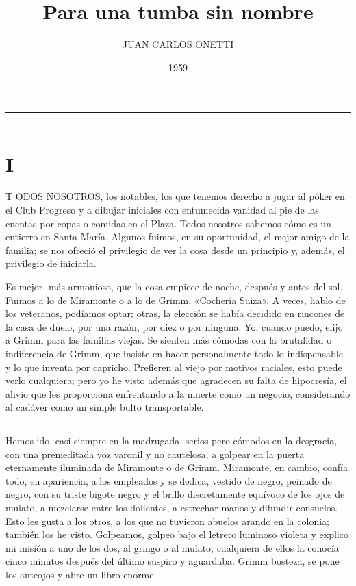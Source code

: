 ﻿\documentclass[oneside,10pt,showtrims]{memoir}
\title{Para una tumba sin nombre}
\author{JUAN CARLOS ONETTI}
\date{1959}
\makeatletter
\def\maketitle{%
\null
\thispagestyle{empty}%
\vskip 1cm
\begin{flushright}
\normalfont\Large \@author
\end{flushright}
\vfil
\hrule height 2pt
\par
\begin{center}
\Huge\strut \@title \par
\end{center}
\hrule height 2pt
\par
\vfil
\vfil
\null
\cleardoublepage
}
\makeatother
\begin{document}
\maketitle
\mainmatter
\chapter{I}
\pagestyle{empty}
\lettrine[slope=0pt,findent=0em,nindent=-.4em]{T}{}
\small ODOS NOSOTROS\normalsize {}, los notables, los que tenemos derecho a jugar al póker en el Club Progreso y a dibujar iniciales con entumecida vanidad al pie de las cuentas por copas o comidas en el Plaza. Todos nosotros sabemos cómo es un entierro en Santa María. Algunos fuimos, en su oportunidad, el mejor amigo de la familia; se nos ofreció el privilegio de ver la cosa desde un principio y, además, el privilegio de iniciarla.

Es mejor, más armonioso, que la cosa empiece de noche, después y antes del sol. Fuimos a lo de Miramonte o a lo de Grimm, «Cochería Suiza». A veces, hablo de los veteranos, podíamos optar; otras, la elección se había decidido en rincones de la casa de duelo, por una razón, por diez o por ninguna. Yo, cuando puedo, elijo a Grimm para las familias viejas. Se sienten más cómodas con la brutalidad o indiferencia de Grimm, que insiste en hacer personalmente todo lo indispensable y lo que inventa por capricho. Prefieren al viejo por motivos raciales, esto puede verlo cualquiera; pero yo he visto además que agradecen su falta de hipocresía, el alivio que les proporciona enfrentando a la muerte como un negocio, considerando al cadáver como un simple bulto transportable.
\renewcommand{\pfbreakdisplay}{%
\decofourright\quad\decofourright\quad\decofourright}
\fancybreak{\pfbreakdisplay}
Hemos ido, casi siempre en la madrugada, serios pero cómodos en la desgracia, con una premeditada voz varonil y no cautelosa, a golpear en la puerta eternamente iluminada de Miramonte o de Grimm. Miramonte, en cambio, confía todo, en apariencia, a los empleados y se dedica, vestido de negro, peinado de negro, con su triste bigote negro y el brillo discretamente equívoco de los ojos de mulato, a mezclarse entre los dolientes, a estrechar manos y difundir consuelos. Esto les gusta a los otros, a los que no tuvieron abuelos arando en la colonia; también los he visto. Golpeamos, golpeo bajo el letrero luminoso violeta y explico mi misión a uno de los dos, al gringo o al mulato; cualquiera de ellos la conocía cinco minutos después del último suspiro y aguardaba. Grimm bosteza, se pone los anteojos y abre un libro enorme.
\end{document}
